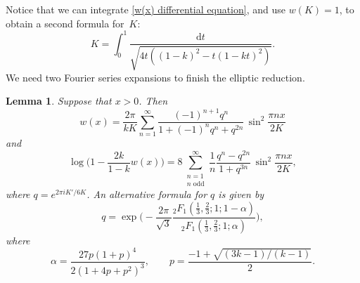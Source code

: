 \documentclass[12pt,reqno]{amsart}
\newtheorem{lemma}{Lemma}
\theoremstyle{remark}
\begin{document}
Notice that we can integrate \eqref{w(x) differential equation},
and use $w(K)=1$, to obtain a second formula for~$K$:
\begin{equation*}
K=\int_{0}^{1}\frac{{{\mathrm d}} t}{\sqrt{4t((1-k)^2-t(1-k t)^2)}}.
\end{equation*}
We need two Fourier series expansions to finish the elliptic
reduction.

\begin{lemma}\label{w(x) fourier series lemma}
Suppose that $x>0$.  Then
\begin{equation}\label{w(x) Fourier series}
w(x)=\frac{2\pi}{k K}\sum_{n=1}^{\infty}\frac{(-1)^{n+1}q^n}{1+(-1)^n q^n+q^{2n}}
\,\sin^2\frac{\pi n x}{2K}
\end{equation}
and
\begin{equation}\label{log(1+4w(x)) Fourier series}
\log\biggl(1-\frac{2k}{1-k}w(x)\biggr)
=8\sum_{\substack{n=1\\n \text{ odd}}}^{\infty}
\frac{1}{n}\frac{q^{n}-q^{2n}}{1+q^{3n}}\,\sin^2\frac{\pi n x}{2K},
\end{equation}
where $q=e^{2\pi i K'/6K}$.  An alternative formula for $q$ is
given by
\begin{equation}\label{w(x) fourier series value of q}
q=\exp\biggl(-\frac{2\pi}{\sqrt{3}}\frac{{}_2F_1(\frac{1}{3},\frac{2}{3};1;1-\alpha)}
{{}_2F_1(\frac{1}{3},\frac{2}{3};1;\alpha)}\biggr),
\end{equation}
where
\begin{equation*}
\alpha=\frac{27 p (1 + p)^4}{2 (1 + 4 p + p^2)^3},
\qquad
p=\frac{-1+\sqrt{(3k-1)/(k-1)}}{2}.
\end{equation*}
\end{lemma}
\end{document}
